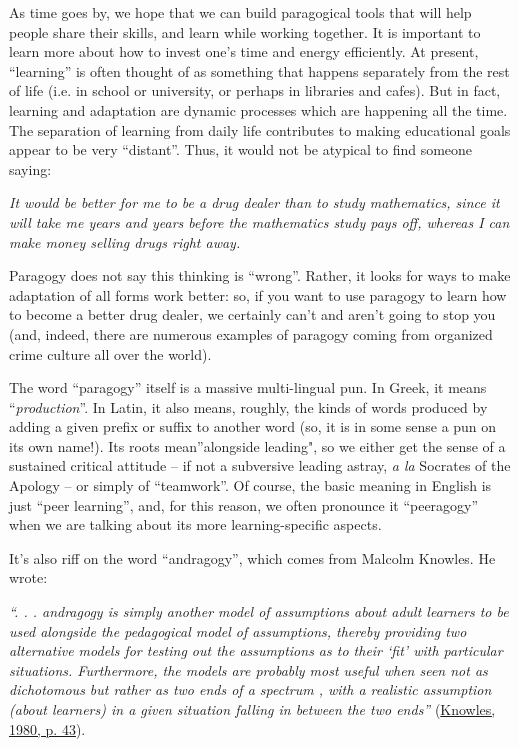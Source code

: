 As time goes by, we hope that we can build paragogical tools that will
help people share their skills, and learn while working together. It is
important to learn more about how to invest one's time and energy
efficiently. At present, ``learning'' is often thought of as something
that happens separately from the rest of life (i.e. in school or
university, or perhaps in libraries and cafes). But in fact, learning
and adaptation are dynamic processes which are happening all the time.
The separation of learning from daily life contributes to making
educational goals appear to be very ``distant''. Thus, it would not be
atypical to find someone saying:

\emph{It would be better for me to be a drug dealer than to study
mathematics, since it will take me years and years before the
mathematics study pays off, whereas I can make money selling drugs right
away.}

Paragogy does not say this thinking is ``wrong''. Rather, it looks for
ways to make adaptation of all forms work better: so, if you want to use
paragogy to learn how to become a better drug dealer, we certainly can't
and aren't going to stop you (and, indeed, there are numerous examples
of paragogy coming from organized crime culture all over the world).

The word ``paragogy'' itself is a massive multi-lingual pun. In Greek,
it means ``\emph{production}''. In Latin, it also means, roughly, the
kinds of words produced by adding a given prefix or suffix to another
word (so, it is in some sense a pun on its own name!). Its roots
mean''alongside leading", so we either get the sense of a sustained
critical attitude -- if not a subversive leading astray, \emph{a la}
Socrates of the Apology -- or simply of ``teamwork''. Of course, the
basic meaning in English is just ``peer learning'', and, for this
reason, we often pronounce it ``peeragogy'' when we are talking about
its more learning-specific aspects.

It's also riff on the word ``andragogy'', which comes from Malcolm
Knowles. He wrote:

\emph{``. . . andragogy is simply another model of assumptions about
adult learners to be used alongside the pedagogical model of
assumptions, thereby providing two alternative models for testing out
the assumptions as to their `fit' with particular situations.
Furthermore, the models are probably most useful when seen not as
dichotomous but rather as two ends of a spectrum , with a realistic
assumption (about learners) in a given situation falling in between the
two ends''}
(\href{http://openlibrary.org/works/OL10335330W/The\_modern\_practice\_of\_adult\_education}{Knowles,
1980, p. 43}).

